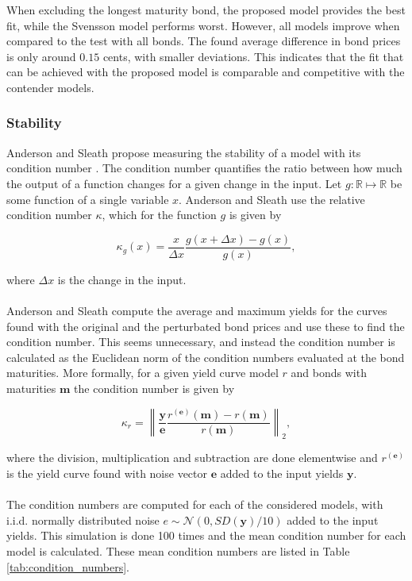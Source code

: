 \documentclass[a4paper]{artikel3}
\newcommand{\R}{\mathbb{R}}    %
\numberwithin{equation}{section}
\numberwithin{theorem}{section}
\numberwithin{proposition}{section}
\numberwithin{lemma}{section}
\begin{document}
When excluding the longest maturity bond, the proposed model provides the best fit, while the Svensson model performs worst. However, all models improve when compared to the test with all bonds. The found average difference in bond prices is only around $0.15$ cents, with smaller deviations. This indicates that the fit that can be achieved with the proposed model is comparable and competitive with the contender models. 


\subsubsection{Stability}
\label{sec:stability}

Anderson and Sleath propose measuring the stability of a model with its condition number \cite{anderson_sleath_1999}. The condition number quantifies the ratio between how much the output of a function changes for a given change in the input. Let $g : \R \mapsto \R$ be some function of a single variable $x$. Anderson and Sleath use the relative condition number $\kappa$, which for the function $g$ is given by 

\begin{equation*}
    \kappa_g(x) = \frac{x}{\Delta x}\frac{g(x + \Delta x) - g(x)}{g(x)} ,
\end{equation*}

where $\Delta x$ is the change in the input. \\
\\
Anderson and Sleath compute the average and maximum yields for the curves found with the original and the perturbated bond prices and use these to find the condition number. This seems unnecessary, and instead the condition number is calculated as the Euclidean norm of the condition numbers evaluated at the bond maturities. More formally, for a given yield curve model $r$ and bonds with maturities $\mathbf{m}$ the condition number is given by

\begin{equation*}
    \kappa_r = \left\| \frac{\mathbf{y}}{\mathbf{e}} \frac{r^{(\mathbf{e})}(\mathbf{m}) - r(\mathbf{m})}{r(\mathbf{m})} \right\|_2 ,
\end{equation*}

where the division, multiplication and subtraction are done elementwise and $r^{(\mathbf{e})}$ is the yield curve found with noise vector $\mathbf{e}$ added to the input yields $\mathbf{y}$. \\
\\
The condition numbers are computed for each of the considered models, with i.i.d. normally distributed noise $e \sim \mathcal{N}(0, SD(\mathbf{y}) / 10)$ added to the input yields. This simulation is done 100 times and the mean condition number for each model is calculated. These mean condition numbers are listed in Table \ref{tab:condition_numbers}.
\end{document}
